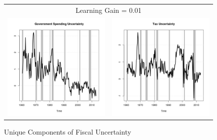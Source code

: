 \documentclass[11pt]{article}
\begin{document}
\begin{figure}\caption{Unique Components of Fiscal Uncertainty}\label{fg:fpuremove0.01}
\begin{center}
\begin{tabular}{cc}
\multicolumn{2}{c}{Learning Gain = 0.01} \\ [0.5pc]
\includegraphics[scale=0.45]{./results/pics0.01/fpucoin_gov.png} & \includegraphics[scale=0.45]{./results/pics0.01/fpucoin_tax.png} \\

\end{tabular}
\end{center}
\end{figure}
\end{document}
